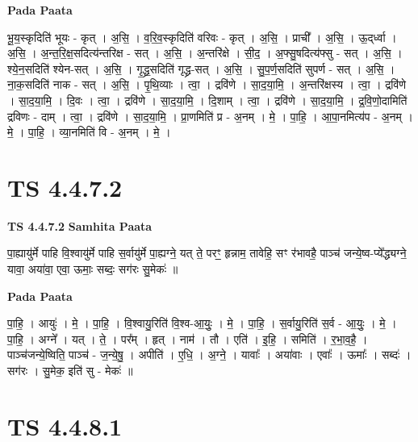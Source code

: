 \documentclass[17pt]{extarticle}
\begin{document}
\textbf{Pada Paata} \newline

भू॒य॒स्कृदिति॑ भूयः - कृत् । अ॒सि॒ । व॒रि॒व॒स्कृदिति॑ वरिवः - कृत् । अ॒सि॒ । प्राची᳚ । अ॒सि॒ । ऊ॒द्‌र्ध्वा । अ॒सि॒ । अ॒न्त॒रि॒क्ष॒सदित्य॑न्तरिक्ष - सत् । अ॒सि॒ । अ॒न्तरि॑क्षे । सी॒द॒ । अ॒फ्सु॒षदित्य॑फ्सु - सत् । अ॒सि॒ । श्ये॒न॒सदिति॑ श्येन-सत् । अ॒सि॒ । गृ॒द्ध्र॒सदिति॑ गृद्ध्र-सत् । अ॒सि॒ । सु॒प॒र्ण॒सदिति॑ सुपर्ण - सत् । अ॒सि॒ । ना॒क॒सदिति॑ नाक - सत् । अ॒सि॒ । पृ॒थि॒व्याः । त्वा॒ । द्रवि॑णे । सा॒द॒या॒मि॒ । अ॒न्तरि॑क्षस्य । त्वा॒ । द्रवि॑णे । सा॒द॒या॒मि॒ । दि॒वः । त्वा॒ । द्रवि॑णे । सा॒द॒या॒मि॒ । दि॒शाम् । त्वा॒ । द्रवि॑णे । सा॒द॒या॒मि॒ । द्र॒वि॒णो॒दामिति॑ द्रविणः - दाम् । त्वा॒ । द्रवि॑णे । सा॒द॒या॒मि॒ । प्रा॒णमिति॑ प्र - अ॒नम् । मे॒ । पा॒हि॒ । आ॒पा॒नमित्य॑प - अ॒नम् । मे॒ । पा॒हि॒ । व्या॒नमिति॑ वि - अ॒नम् । मे॒ ।  \newline




\section*{ TS 4.4.7.2 }

\textbf{TS 4.4.7.2 } \newline
\textbf{Samhita Paata} \newline

पा॒ह्यायु॑र्मे पाहि वि॒श्वायु॑र्मे पाहि स॒र्वायु॑र्मे पा॒ह्यग्ने॒ यत् ते॒ परꣳ॒॒ हृन्नाम॒ तावेहि॒ सꣳ र॑भावहै॒ पाञ्च॑ जन्ये॒ष्व-प्ये᳚द्ध्यग्ने॒ यावा॒ अया॑वा॒ एवा॒ ऊमाः॒ सब्दः॒ सग॑रः सु॒मेकः॑ ॥ \newline

\textbf{Pada Paata} \newline

पा॒हि॒ । आयुः॑ । मे॒ । पा॒हि॒ । वि॒श्वायु॒रिति॑ वि॒श्व-आ॒युः॒ । मे॒ । पा॒हि॒ । स॒र्वायु॒रिति॑ स॒र्व - आ॒युः॒ । मे॒ । पा॒हि॒ । अग्ने᳚ । यत् । ते॒ । पर᳚म् । हृत् । नाम॑ । तौ । एति॑ । इ॒हि॒ । समिति॑ । र॒भा॒व॒है॒ । पाञ्च॑जन्ये॒ष्विति॒ पाञ्च॑ - ज॒न्ये॒षु॒ । अपीति॑ । ए॒धि॒ । अ॒ग्ने॒ । यावाः᳚ । अया॑वाः । एवाः᳚ । ऊमाः᳚ । सब्दः॑ । सग॑रः । सु॒मेक॒ इति॑ सु - मेकः॑ ॥  \newline




\section*{ TS 4.4.8.1 }
\end{document}
